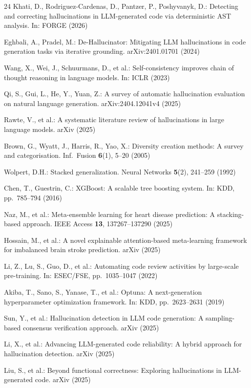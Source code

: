 \documentclass[runningheads]{llncs}
\begin{document}
\begin{thebibliography}{24}
Khati, D., Rodriguez-Cardenas, D., Pantzer, P., Poshyvanyk, D.: Detecting and correcting hallucinations in LLM-generated code via deterministic AST analysis. In: FORGE (2026)

Eghbali, A., Pradel, M.: De-Hallucinator: Mitigating LLM hallucinations in code generation tasks via iterative grounding. arXiv:2401.01701 (2024)

Wang, X., Wei, J., Schuurmans, D., et al.: Self-consistency improves chain of thought reasoning in language models. In: ICLR (2023)

Qi, S., Gui, L., He, Y., Yuan, Z.: A survey of automatic hallucination evaluation on natural language generation. arXiv:2404.12041v4 (2025)

Rawte, V., et al.: A systematic literature review of hallucinations in large language models. arXiv (2025)

Brown, G., Wyatt, J., Harris, R., Yao, X.: Diversity creation methods: A survey and categorisation. Inf.\ Fusion \textbf{6}(1), 5--20 (2005)

Wolpert, D.H.: Stacked generalization. Neural Networks \textbf{5}(2), 241--259 (1992)

Chen, T., Guestrin, C.: XGBoost: A scalable tree boosting system. In: KDD, pp.~785--794 (2016)

Naz, M., et al.: Meta-ensemble learning for heart disease prediction: A stacking-based approach. IEEE Access \textbf{13}, 137267--137290 (2025)

Hossain, M., et al.: A novel explainable attention-based meta-learning framework for imbalanced brain stroke prediction. arXiv (2025)

Li, Z., Lu, S., Guo, D., et al.: Automating code review activities by large-scale pre-training. In: ESEC/FSE, pp.~1035--1047 (2022)

Akiba, T., Sano, S., Yanase, T., et al.: Optuna: A next-generation hyperparameter optimization framework. In: KDD, pp.~2623--2631 (2019)

Sun, Y., et al.: Hallucination detection in LLM code generation: A sampling-based consensus verification approach. arXiv (2025)

Li, X., et al.: Advancing LLM-generated code reliability: A hybrid approach for hallucination detection. arXiv (2025)

Liu, S., et al.: Beyond functional correctness: Exploring hallucinations in LLM-generated code. arXiv (2025)

\end{thebibliography}
\end{document}
